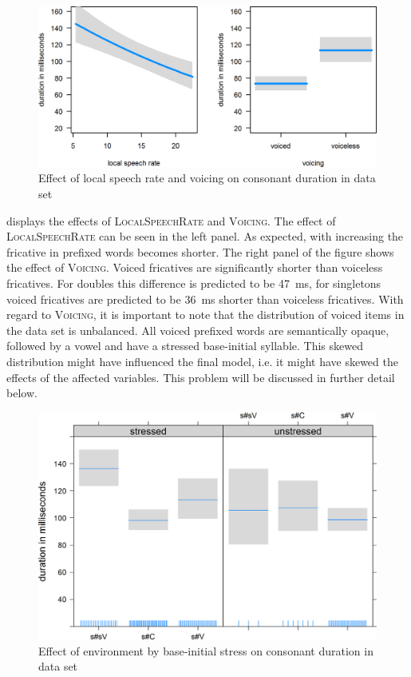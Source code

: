 \begin{figure}
	
	\includegraphics[scale=.8] {images/Corpus/disModelcov.png}
	\caption{ Effect of local speech rate and voicing on consonant duration in data set}
	\label{fig:corpus covariates dis}
\end{figure}


 displays the effects of \textsc{LocalSpeechRate} and \textsc{Voicing}. The effect of \textsc{LocalSpeechRate} can be seen in the left panel. As expected, with increasing  the fricative in prefixed words becomes shorter. 
The right panel of the figure shows the effect of \textsc{Voicing}. Voiced fricatives are significantly shorter than voiceless fricatives. For doubles this difference is predicted to be 47~ms, for singletons voiced fricatives are predicted to be 36~ms shorter than voiceless fricatives. 
With regard to \textsc{Voicing}, it is important to note that the distribution of voiced items in the data set is unbalanced. All voiced prefixed words are semantically opaque, followed by a vowel and have a stressed base-initial syllable. This skewed distribution might have influenced the final model, i.e. it might have skewed the effects of the affected variables. This problem will be discussed in further detail below.

\begin{figure}

	
	\includegraphics [scale=0.5]{images/Corpus/disModelTransitionTypeByStress.png}
	\caption{Effect of environment by base-initial stress on consonant duration in data set}
	\label{fig:corpus main effect 1 dis}
\end{figure}

